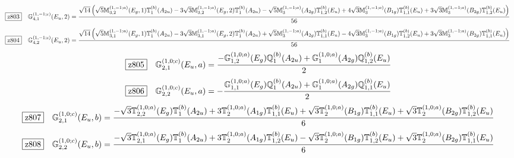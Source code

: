 \documentclass[fleqn,10pt,landscape]{jsarticle}
\begin{document}
\begin{dmath*}
\hspace*{3mm}\fbox{z803}\quad \mathbb{G}_{4,1}^{(1,-1;c)}(E_{u},2)=\frac{\sqrt{14} \left(\sqrt{5} \mathbb{M}_{3,2}^{(1,-1;a)}(E_{g},1) \mathbb{T}_{1}^{(b)}(A_{2u}) - 3 \sqrt{3} \mathbb{M}_{3,2}^{(1,-1;a)}(E_{g},2) \mathbb{T}_{1}^{(b)}(A_{2u}) - \sqrt{5} \mathbb{M}_{3}^{(1,-1;a)}(A_{2g}) \mathbb{T}_{1,2}^{(b)}(E_{u}) + 4 \sqrt{3} \mathbb{M}_{3}^{(1,-1;a)}(B_{1g}) \mathbb{T}_{1,1}^{(b)}(E_{u}) + 3 \sqrt{3} \mathbb{M}_{3}^{(1,-1;a)}(B_{2g}) \mathbb{T}_{1,2}^{(b)}(E_{u})\right)}{56}
\end{dmath*}
\begin{dmath*}
\hspace*{3mm}\fbox{z804}\quad \mathbb{G}_{4,2}^{(1,-1;c)}(E_{u},2)=\frac{\sqrt{14} \left(\sqrt{5} \mathbb{M}_{3,1}^{(1,-1;a)}(E_{g},1) \mathbb{T}_{1}^{(b)}(A_{2u}) - 3 \sqrt{3} \mathbb{M}_{3,1}^{(1,-1;a)}(E_{g},2) \mathbb{T}_{1}^{(b)}(A_{2u}) + \sqrt{5} \mathbb{M}_{3}^{(1,-1;a)}(A_{2g}) \mathbb{T}_{1,1}^{(b)}(E_{u}) - 4 \sqrt{3} \mathbb{M}_{3}^{(1,-1;a)}(B_{1g}) \mathbb{T}_{1,2}^{(b)}(E_{u}) + 3 \sqrt{3} \mathbb{M}_{3}^{(1,-1;a)}(B_{2g}) \mathbb{T}_{1,1}^{(b)}(E_{u})\right)}{56}
\end{dmath*}
\begin{dmath*}
\hspace*{3mm}\fbox{z805}\quad \mathbb{G}_{2,1}^{(1,0;c)}(E_{u},a)=\frac{- \mathbb{G}_{1,2}^{(1,0;a)}(E_{g}) \mathbb{Q}_{1}^{(b)}(A_{2u}) + \mathbb{G}_{1}^{(1,0;a)}(A_{2g}) \mathbb{Q}_{1,2}^{(b)}(E_{u})}{2}
\end{dmath*}
\begin{dmath*}
\hspace*{3mm}\fbox{z806}\quad \mathbb{G}_{2,2}^{(1,0;c)}(E_{u},a)=- \frac{\mathbb{G}_{1,1}^{(1,0;a)}(E_{g}) \mathbb{Q}_{1}^{(b)}(A_{2u}) + \mathbb{G}_{1}^{(1,0;a)}(A_{2g}) \mathbb{Q}_{1,1}^{(b)}(E_{u})}{2}
\end{dmath*}
\begin{dmath*}
\hspace*{3mm}\fbox{z807}\quad \mathbb{G}_{2,1}^{(1,0;c)}(E_{u},b)=\frac{- \sqrt{3} \mathbb{T}_{2,2}^{(1,0;a)}(E_{g}) \mathbb{T}_{1}^{(b)}(A_{2u}) + 3 \mathbb{T}_{2}^{(1,0;a)}(A_{1g}) \mathbb{T}_{1,1}^{(b)}(E_{u}) + \sqrt{3} \mathbb{T}_{2}^{(1,0;a)}(B_{1g}) \mathbb{T}_{1,1}^{(b)}(E_{u}) + \sqrt{3} \mathbb{T}_{2}^{(1,0;a)}(B_{2g}) \mathbb{T}_{1,2}^{(b)}(E_{u})}{6}
\end{dmath*}
\begin{dmath*}
\hspace*{3mm}\fbox{z808}\quad \mathbb{G}_{2,2}^{(1,0;c)}(E_{u},b)=\frac{- \sqrt{3} \mathbb{T}_{2,1}^{(1,0;a)}(E_{g}) \mathbb{T}_{1}^{(b)}(A_{2u}) + 3 \mathbb{T}_{2}^{(1,0;a)}(A_{1g}) \mathbb{T}_{1,2}^{(b)}(E_{u}) - \sqrt{3} \mathbb{T}_{2}^{(1,0;a)}(B_{1g}) \mathbb{T}_{1,2}^{(b)}(E_{u}) + \sqrt{3} \mathbb{T}_{2}^{(1,0;a)}(B_{2g}) \mathbb{T}_{1,1}^{(b)}(E_{u})}{6}
\end{dmath*}
\end{document}
